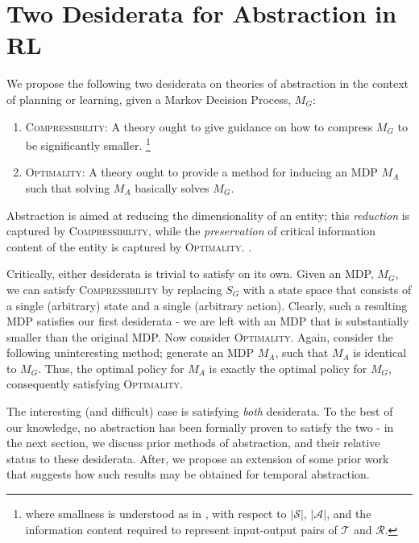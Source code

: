 \section{Two Desiderata for Abstraction in RL}

We propose the following two desiderata on theories of abstraction in the context of planning or learning, given a Markov Decision Process, $M_G$:
\begin{enumerate}
\item \textsc{Compressibility}: A theory ought to give guidance on how to compress $M_G$ to be significantly smaller. \footnote{where smallness is understood as in \cite{littman1995complexity}, with respect to $|\mathcal{S}|$, $|\mathcal{A}|$, and the information content required to represent input-output pairs of $\mathcal{T}$ and $\mathcal{R}$.}
\item \textsc{Optimality}: A theory ought to provide a method for inducing an MDP $M_A$ such that solving $M_A$ basically solves $M_G$.
\end{enumerate}

Abstraction is aimed at reducing the dimensionality of an entity; this {\it reduction} is captured by \textsc{Compressibility}, while the {\it preservation} of critical information content of the entity is captured by \textsc{Optimality}. .

Critically, either desiderata is trivial to satisfy on its own. Given an \ac{MDP}, $M_G$, we can satisfy \textsc{Compressibility} by replacing $S_G$ with a state space that consists of a single (arbitrary) state and a single (arbitrary action). Clearly, such a resulting \ac{MDP} satisfies our first desiderata - we are left with an MDP that is substantially smaller than the original MDP. Now consider \textsc{Optimality}. Again, consider the following uninteresting method; generate an MDP $M_A$, such that $M_A$ is identical to $M_G$. Thus, the optimal policy for $M_A$ is exactly the optimal policy for $M_G$, consequently satisfying \textsc{Optimality}.

The interesting (and difficult) case is satisfying {\it both} desiderata. To the best of our knowledge, no abstraction has been formally proven to satisfy the two - in the next section, we discuss prior methods of abstraction, and their relative status to these desiderata. After, we propose an extension of some prior work that suggests how such results may be obtained for temporal abstraction.